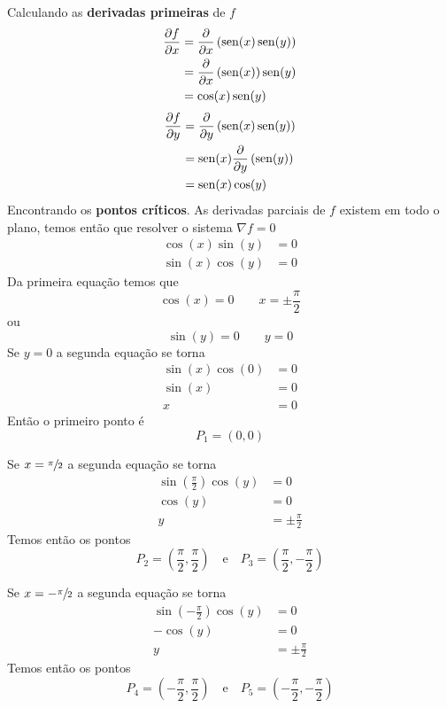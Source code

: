 \documentclass[a4paper,12pt,fleqn]{article}
\begin{document}
\begin{answer}
  \setlength\columnsep{3em}
  \begin{multicols}{2}
    \raggedcolumns
    Calculando as \textbf{derivadas primeiras} de $f$
    \begin{align*}
      \frac{\partial {f}}{\partial {x}}
      & = \frac{\partial {}}{\partial {x}}\left(\operatorname{sen}(x)\operatorname{sen}(y)\right) \\
      & = \frac{\partial {}}{\partial {x}}\left(\operatorname{sen}(x)\right)\operatorname{sen}(y) \\
      & = \cos(x)\operatorname{sen}(y)
    \end{align*}
    \begin{align*}
      \frac{\partial {f}}{\partial {y}}
      & = \frac{\partial {}}{\partial {y}}\left(\operatorname{sen}(x)\operatorname{sen}(y)\right) \\
      & = \operatorname{sen}(x)\frac{\partial {}}{\partial {y}}\left(\operatorname{sen}(y)\right) \\
      & = \operatorname{sen}(x)\cos(y)
    \end{align*}
    Encontrando os \textbf{pontos críticos}.
    As derivadas parciais de $f$ existem em todo o plano,
    temos então que resolver o sistema \(\nabla f = 0\)
    \begin{align*}
      \cos(x)\sin(y) & = 0 \\
      \sin(x)\cos(y) & = 0
    \end{align*}
    Da primeira equação temos que
    \[
      \cos(x) = 0 \qquad x = \pm\frac{\pi}{2}
    \]
    ou
    \[
      \sin(y) = 0 \qquad y = 0
    \]
    Se $y=0$ a segunda equação se torna
    \begin{align*}
      \sin(x)\cos(0) & = 0 \\
      \sin(x)        & = 0 \\
      x              & = 0
    \end{align*}
    Então o primeiro ponto é
    \[
      P_1 = (0, 0)
    \]

    \vspace{\baselineskip}
    Se $x = \sfrac{\pi}{2}$ a segunda equação se torna
    \begin{align*}
      \sin\left(\frac{\pi}{2}\right)\cos(y) & = 0                \\
      \cos(y)                               & = 0                \\
      y                                     & = \pm\frac{\pi}{2}
    \end{align*}
    Temos então os pontos
    \[
      P_2 = \left(\frac{\pi}{2}, \frac{\pi}{2}\right)
      \quad\text{e}\quad
      P_3 = \left(\frac{\pi}{2}, -\frac{\pi}{2}\right)
    \]

    \vspace{\baselineskip}
    Se $x = -\sfrac{\pi}{2}$ a segunda equação se torna
    \begin{align*}
      \sin\left(-\frac{\pi}{2}\right)\cos(y) & = 0                \\
      -\cos(y)                               & = 0                \\
      y                                      & = \pm\frac{\pi}{2}
    \end{align*}
    Temos então os pontos
    \[
      P_4 = \left(-\frac{\pi}{2}, \frac{\pi}{2}\right)
      \quad\text{e}\quad
      P_5 = \left(-\frac{\pi}{2}, -\frac{\pi}{2}\right)
    \]


\end{multicols}
\end{answer}
\end{document}
